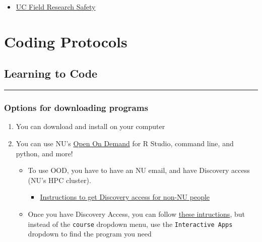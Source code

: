 \documentclass[
  letterpaper,
  DIV=11,
  numbers=noendperiod]{scrreprt}
\providecommand{\tightlist}{%
  \setlength{\itemsep}{0pt}\setlength{\parskip}{0pt}}\usepackage{longtable,booktabs,array}
\begin{document}

\begin{itemize}
\tightlist
\item
  \href{https://www.ucop.edu/safety-and-loss-prevention/_files/field-research-safety/uc-field-research-safety-manual.pdf}{UC
  Field Research Safety}
\end{itemize}

\part{Coding Protocols}

\hypertarget{learning-to-code}{%
\chapter{Learning to Code}\label{learning-to-code}}

\begin{center}\rule{0.5\linewidth}{0.5pt}\end{center}

\hypertarget{options-for-downloading-programs}{%
\section{Options for downloading
programs}\label{options-for-downloading-programs}}

\begin{enumerate}
\def\labelenumi{\arabic{enumi}.}
\item
  You can download and install on your computer
\item
  You can use NU's
  \href{https://drk-lo.github.io/lotterhoslabprotocols/code_LearningToCode/ood.discovery.neu.edu}{Open
  On Demand} for R Studio, command line, and python, and more!

  \begin{itemize}
  \item
    To use OOD, you have to have an NU email, and have Discovery access
    (NU's HPC cluster).

    \begin{itemize}
    \tightlist
    \item
      \href{https://drk-lo.github.io/lotterhoslabprotocols/discovery_nonNEUpersonnel/}{Instructions
      to get Discovery access for non-NU people}
    \end{itemize}
  \item
    Once you have Discovery Access, you can follow
    \href{https://docs.google.com/document/d/1sJAnQXE8-r_4ssr5VfVv0oZKFrrrRFxspdxx2kNdaLI/edit\#heading=h.61692qeq0wnf}{these
    intructions}, but instead of the \texttt{course} dropdown menu, use
    the \texttt{Interactive\ Apps} dropdown to find the program you need
  \end{itemize}
\end{enumerate}
\end{document}
